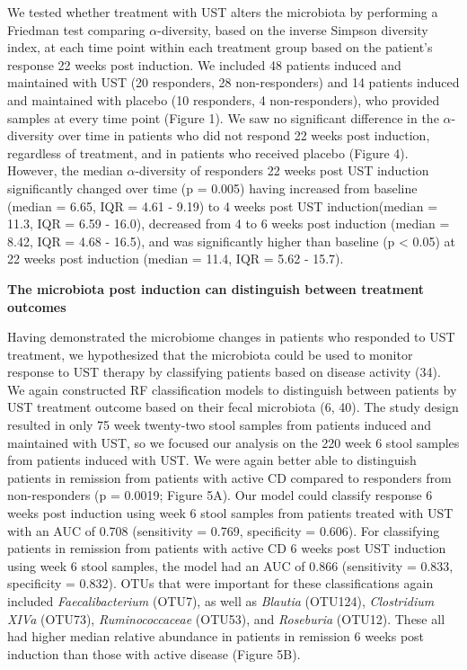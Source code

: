 \documentclass[12pt,]{article}
\begin{document}
We tested whether treatment with UST alters the microbiota by performing
a Friedman test comparing \({\alpha}\)-diversity, based on the inverse
Simpson diversity index, at each time point within each treatment group
based on the patient's response 22 weeks post induction. We included 48
patients induced and maintained with UST (20 responders, 28
non-responders) and 14 patients induced and maintained with placebo (10
responders, 4 non-responders), who provided samples at every time point
(Figure 1). We saw no significant difference in the
\({\alpha}\)-diversity over time in patients who did not respond 22
weeks post induction, regardless of treatment, and in patients who
received placebo (Figure 4). However, the median \({\alpha}\)-diversity
of responders 22 weeks post UST induction significantly changed over
time (p = 0.005) having increased from baseline (median = 6.65, IQR =
4.61 - 9.19) to 4 weeks post UST induction(median = 11.3, IQR = 6.59 -
16.0), decreased from 4 to 6 weeks post induction (median = 8.42, IQR =
4.68 - 16.5), and was significantly higher than baseline (p \textless{}
0.05) at 22 weeks post induction (median = 11.4, IQR = 5.62 - 15.7).

\textbf{The microbiota post induction can distinguish between treatment
outcomes}

Having demonstrated the microbiome changes in patients who responded to
UST treatment, we hypothesized that the microbiota could be used to
monitor response to UST therapy by classifying patients based on disease
activity (34). We again constructed RF classification models to
distinguish between patients by UST treatment outcome based on their
fecal microbiota (6, 40). The study design resulted in only 75 week
twenty-two stool samples from patients induced and maintained with UST,
so we focused our analysis on the 220 week 6 stool samples from patients
induced with UST. We were again better able to distinguish patients in
remission from patients with active CD compared to responders from
non-responders (p = 0.0019; Figure 5A). Our model could classify
response 6 weeks post induction using week 6 stool samples from patients
treated with UST with an AUC of 0.708 (sensitivity = 0.769, specificity
= 0.606). For classifying patients in remission from patients with
active CD 6 weeks post UST induction using week 6 stool samples, the
model had an AUC of 0.866 (sensitivity = 0.833, specificity = 0.832).
OTUs that were important for these classifications again included
\emph{Faecalibacterium} (OTU7), as well as \emph{Blautia} (OTU124),
\emph{Clostridium XIVa} (OTU73), \emph{Ruminococcaceae} (OTU53), and
\emph{Roseburia} (OTU12). These all had higher median relative abundance
in patients in remission 6 weeks post induction than those with active
disease (Figure 5B).
\end{document}
